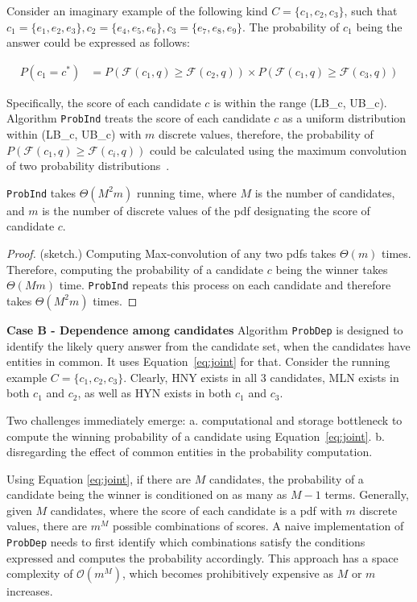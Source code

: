 Consider an imaginary example of the following kind $C=\{c_1,c_2,c_3\}$, such that $c_1=\{e_1,e_2,e_3\}, c_2=\{e_4,e_5,e_6\},c_3=\{e_7,e_8,e_9\}$. The probability of $c_1$ being the answer could be expressed as follows:

\begin{align*}
P(c_1 = c^*) &=  P\left(\mathcal{F}(c_1, q) \geq \mathcal{F}(c_2, q)\right) \times P\left(\mathcal{F}(c_1, q) \geq \mathcal{F}(c_3, q)\right)
\end{align*}

Specifically, the score of each candidate $c$ is within the range (LB\_c, UB\_c). Algorithm {\tt ProbInd} treats the score of each candidate $c$ as a uniform distribution within (LB\_c, UB\_c) with $m$ discrete values, therefore, the probability of $P\left(\mathcal{F}(c_1, q) \geq \mathcal{F}(c_i, q)\right)$ could be calculated using the maximum convolution of two probability distributions~\cite{rahman2015worker}.

\begin{lemma}
 {\tt ProbInd} takes $\Theta(M^2m)$ running time, where $M$ is the number of candidates, and $m$ is the number of discrete values of the pdf designating the score of candidate $c$.
\end{lemma}

\begin{proof}
(sketch.) Computing Max-convolution of any two pdfs takes $\Theta(m)$ times. Therefore, computing the probability of a candidate $c$ being the winner takes $\Theta(Mm)$ time.  {\tt ProbInd} repeats this process on each candidate and therefore takes $\Theta(M^2m)$ times.
\end{proof}

\noindent \textbf {Case B - Dependence among candidates}
Algorithm {\tt ProbDep} is designed to identify the likely query answer from the candidate set, when the candidates have entities in common. It uses Equation~\ref{eq:joint} for that. Consider the running example $C=\{c_1,c_2,c_3\}$. Clearly, HNY exists in all $3$ candidates, MLN exists in both $c_1$ and $c_2$, as well as HYN exists in both $c_1$ and $c_3$. 

Two challenges immediately emerge: a. computational and storage bottleneck to compute the winning probability of a candidate using Equation~\ref{eq:joint}. b. disregarding the effect of common entities in the probability computation.

Using Equation \ref{eq:joint}, if there are $M$ candidates, the probability of a candidate being the winner is conditioned on as many as $M-1$ terms. Generally, given $M$ candidates, where the score of each candidate is a pdf with $m$ discrete values, there are $m^M$ possible combinations of scores. A naive implementation of {\tt ProbDep} needs to first identify which combinations satisfy the conditions expressed and computes the probability accordingly. This approach has a space complexity of $\mathcal{O}(m^M)$, which becomes prohibitively expensive as $M$ or $m$ increases.

